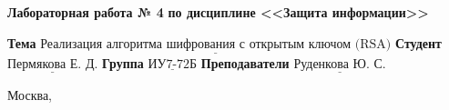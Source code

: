 \vspace{1cm}

\begin{center}
	\noindent\begin{minipage}{1.3\textwidth}\centering
		\Large\textbf{  Лабораторная работа № 4}\newline
		\textbf{по дисциплине <<Защита информации>>}\newline\newline
	\end{minipage}
\end{center}

\noindent\textbf{Тема} $\underline{\text{Реализация алгоритма шифрования с открытым ключом (RSA)}}$\newline\newline
\noindent\textbf{Студент} $\underline{\text{Пермякова Е. Д.}}$\newline\newline
\noindent\textbf{Группа} $\underline{\text{ИУ7-72Б}}$\newline\newline
\noindent\textbf{Преподаватели} $\underline{\text{Руденкова Ю. С.}}$\newline

\begin{center}
	\vfill
	Москва,~\the\year
\end{center}
\clearpage
